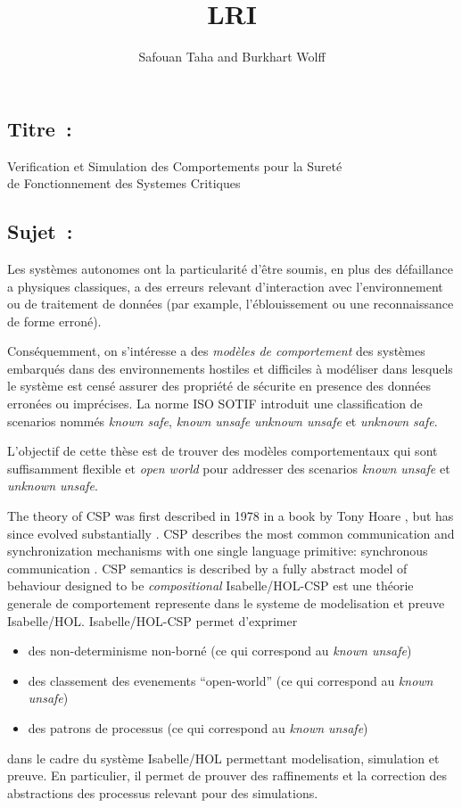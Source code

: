 \documentclass[a4paper,10pt]{article}
\begin{document}
\title{\textbf{LRI}}
\author{Safouan Taha and Burkhart Wolff}
\date{}

\maketitle

\subsection*{Titre~:}
\begin{center}
\large Verification et Simulation des Comportements pour la Sureté \\ de Fonctionnement des Systemes Critiques
\end{center}

\subsection*{Sujet~:}
Les systèmes autonomes ont la particularité d'être soumis, en plus des défaillance a 
physiques classiques, a des erreurs relevant d'interaction avec l'environnement ou de
traitement de données (par example, l'éblouissement ou une reconnaissance de forme 
erroné).  

Conséquemment, on s'intéresse a des \emph{modèles de comportement}
des systèmes embarqués dans des environnements hostiles et difficiles à modéliser
dans lesquels le système est censé assurer des propriété de sécurite en presence des
données erronées ou imprécises. La norme ISO SOTIF introduit une classification 
de scenarios nommés \emph{known safe}, \emph{known unsafe} \emph{unknown unsafe} et
\emph{unknown safe}. 


L'objectif de cette thèse est de trouver des modèles comportementaux qui sont suffisamment
flexible et \emph{open world} pour addresser des scenarios  \emph{known unsafe} et \emph{unknown unsafe}. 

The theory of CSP was first described in 1978 in a book by Tony Hoare \cite{Hoare:1985:CSP:3921}, 
but has since evolved substantially \cite{BrookesHR84,brookes-roscoe85,roscoe:csp:1998}.
CSP describes the most common communication and synchronization mechanisms
with one single language primitive: synchronous communication . 
CSP semantics is described by a fully abstract model of behaviour designed to be \emph{compositional}
Isabelle/HOL-CSP\cite{XXX} est une théorie generale de comportement represente dans le systeme de modelisation et preuve
Isabelle/HOL\cite{XXX}. Isabelle/HOL-CSP permet d'exprimer
\begin{itemize}
\item  des non-determinisme non-borné (ce qui correspond au \emph{known unsafe}) 
\item des classement des evenements ``open-world'' (ce qui correspond au \emph{known unsafe})
\item des patrons de processus (ce qui correspond au \emph{known unsafe}) 
\end{itemize}
dans le cadre du système Isabelle/HOL permettant modelisation, simulation et preuve.
En particulier, il permet de prouver des raffinements et la correction des abstractions des
processus relevant pour des simulations.
\end{document}
